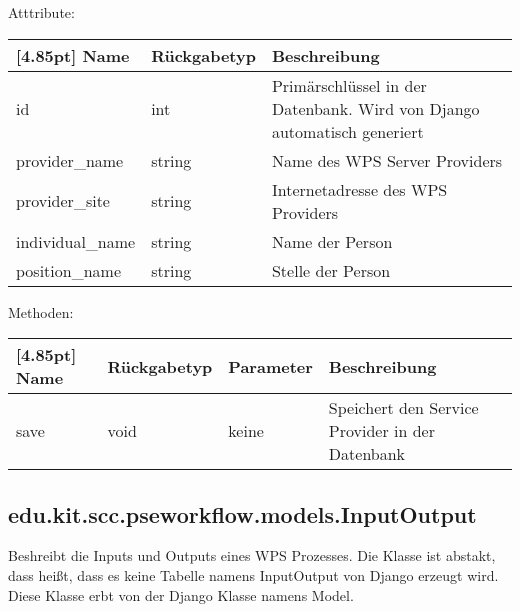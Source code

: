			Atttribute:
			\begin{center}
				\setlength\tabcolsep{5pt}
				\renewcommand{\arraystretch}{1.5}
				
				\begin{tabularx}{\textwidth}{|l|l|X|}
					\hline
					\rowcolor[gray]{0.75}[4.85pt]
					Name & Rückgabetyp & Beschreibung \\ \hline 
					id & int & Primärschlüssel in der Datenbank. Wird von Django automatisch generiert \\ \hline
					provider\_name & string & Name des WPS Server Providers\\ \hline
					provider\_site & string & Internetadresse des WPS Providers \\ \hline
					individual\_name & string & Name der Person\\ \hline
					position\_name & string & Stelle der Person \\ \hline
				\end{tabularx}
			\end{center}
			
			Methoden:
			\begin{center}
				\setlength\tabcolsep{5pt}
				\renewcommand{\arraystretch}{1.5}
				
				\begin{tabularx}{\textwidth}{|l|l|l|X|}
					\hline
					\rowcolor[gray]{0.75}[4.85pt]
					Name & Rückgabetyp & Parameter & Beschreibung \\ \hline 
					save & void & keine & Speichert den Service Provider in der Datenbank \\
					\hline
				\end{tabularx}
			\end{center}
			
		\subsection{edu.kit.scc.pseworkflow.models.InputOutput}
			Beshreibt die Inputs und Outputs eines WPS Prozesses. Die Klasse ist abstakt, dass heißt, dass es keine Tabelle namens InputOutput von Django erzeugt wird. \newline
			Diese Klasse erbt von der Django Klasse namens \glqq Model\grqq .
			
